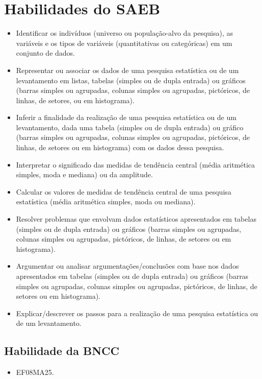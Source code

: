{{{\section*{Habilidades do SAEB}

\begin{itemize}
\item Identificar os indivíduos (universo ou
população-alvo da pesquisa), as variáveis e os tipos de variáveis
(quantitativas ou categóricas) em um conjunto de dados.
\item
  Representar ou associar os dados de uma pesquisa estatística ou de um
  levantamento em listas, tabelas (simples ou de dupla entrada) ou
  gráficos (barras simples ou agrupadas, colunas simples ou agrupadas,
  pictóricos, de linhas, de setores, ou em histograma).
\item
  Inferir a finalidade da realização de uma pesquisa estatística ou de
  um levantamento, dada uma tabela (simples ou de dupla entrada) ou
  gráfico (barras simples ou agrupadas, colunas simples ou agrupadas,
  pictóricos, de linhas, de setores ou em histograma) com os dados dessa
  pesquisa.
\item
  Interpretar o significado das medidas de tendência central (média
  aritmética simples, moda e mediana) ou da amplitude.
\item
  Calcular os valores de medidas de tendência central de uma pesquisa
  estatística (média aritmética simples, moda ou mediana).
\item
  Resolver problemas que envolvam dados estatísticos apresentados em
  tabelas (simples ou de dupla entrada) ou gráficos (barras simples ou
  agrupadas, colunas simples ou agrupadas, pictóricos, de linhas, de
  setores ou em histograma).
\item
  Argumentar ou analisar argumentações/conclusões com base nos dados
  apresentados em tabelas (simples ou de dupla entrada) ou gráficos
  (barras simples ou agrupadas, colunas simples ou agrupadas,
  pictóricos, de linhas, de setores ou em histograma).
\item
  Explicar/descrever os passos para a realização de uma pesquisa
  estatística ou de um levantamento.
\end{itemize}

\subsection{Habilidade da BNCC}

\begin{itemize}
\item EF08MA25.
\end{itemize}


}}}
